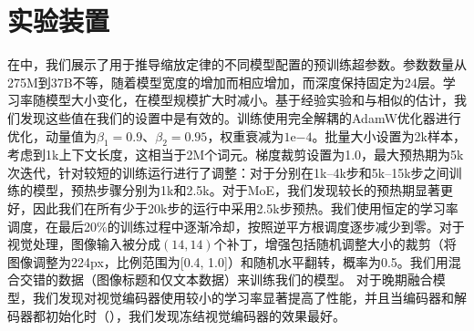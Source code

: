 






\section{实验装置}
\label{app:implementation_details}

在中，我们展示了用于推导缩放定律的不同模型配置的预训练超参数。参数数量从275M到37B不等，随着模型宽度的增加而相应增加，而深度保持固定为24层。学习率随模型大小变化，在模型规模扩大时减小。基于经验实验和与\citep{mckinzie2025mm1}相似的估计，我们发现这些值在我们的设置中是有效的。训练使用完全解耦的AdamW优化器进行优化，动量值为$\beta_1=0.9$、$\beta_2=0.95$，权重衰减为$1\text{e}{-4}$。批量大小设置为2k样本，考虑到1k上下文长度，这相当于2M个词元。梯度裁剪设置为1.0，最大预热期为5k次迭代，针对较短的训练运行进行了调整：对于分别在1k–4k步和5k–15k步之间训练的模型，预热步骤分别为1k和2.5k。对于MoE，我们发现较长的预热期显著更好，因此我们在所有少于20k步的运行中采用2.5k步预热。我们使用恒定的学习率调度，在最后20\%的训练过程中逐渐冷却，按照逆平方根调度逐步减少到零。对于视觉处理，图像输入被分成$(14,14)$个补丁，增强包括随机调整大小的裁剪（将图像调整为224px，比例范围为[0.4, 1.0]）和随机水平翻转，概率为0.5。我们用混合交错的数据（图像标题和仅文本数据）来训练我们的模型。
对于晚期融合模型，我们发现对视觉编码器使用较小的学习率显著提高了性能，并且当编码器和解码器都初始化时（），我们发现冻结视觉编码器的效果最好。


 

          




